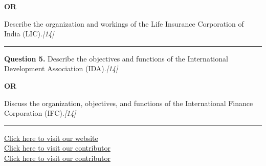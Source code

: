 \documentclass[11pt,a4paper]{article}
\newcommand{\pts}[1]{\hfill   \textit{[#1]}}
\begin{document}
\centerline{   \textbf{OR}}

Describe the organization and workings of the Life Insurance Corporation of India (LIC).\pts{14}

\medskip\rule{\linewidth}{0.2pt}




\noindent   \textbf{Question 5.}
Describe the objectives and functions of the International Development Association (IDA).\pts{14}

\centerline{   \textbf{OR}}

Discuss the organization, objectives, and functions of the International Finance Corporation (IFC).\pts{14}

\vfill
\rule{\linewidth}{0.4pt}

\begin{center}\small
\href{https://bhu-exam.vercel.app/}{Click here to visit our website}\\[4pt]
\href{https://me-aryan.vercel.app/}{Click here to visit our contributor}\\[4pt]
\href{https://quashan-me.vercel.app/}{Click here to visit our contributor}
\end{center}
\end{document}
